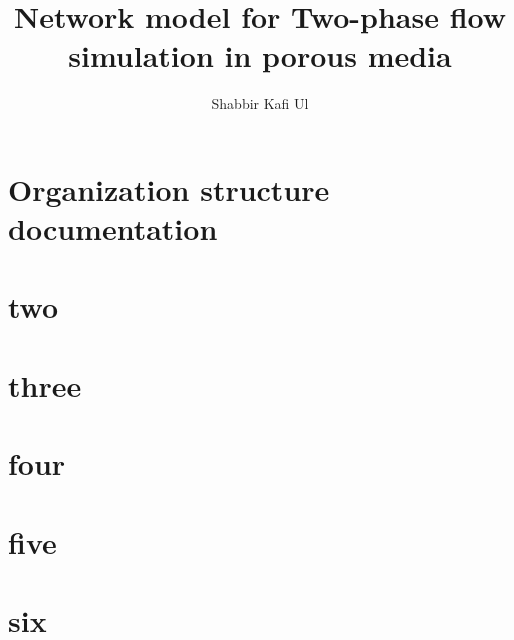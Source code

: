 \documentclass[
	11pt,
	twoside
] {book}
\author[1]{Shabbir Kafi Ul}
\affil[1]{Московский Физико-Технический Институт (национальный исследовательский университет)}
\title{Network model for Two-phase flow simulation in porous media}
\begin{document}
\maketitle
\frontmatter
\tableofcontents

\mainmatter
\chapter{Organization structure documentation}
	

\chapter{two}
	

\chapter{three}
	

\chapter{four}
	

\chapter{five}
	

\chapter{six}
	

\backmatter
\printbibliography
\end{document}

